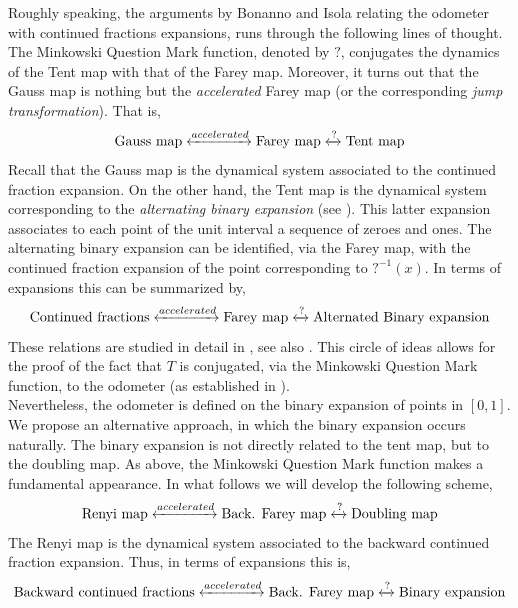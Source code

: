 \documentclass[letterpaper,10pt,reqno]{amsart}
\numberwithin{equation}{section}     %
\begin{document}
Roughly speaking, the arguments by Bonanno and Isola relating the odometer with continued fractions expansions, runs through the following lines of thought. The Minkowski Question Mark function, denoted by $
?$, conjugates the dynamics of the Tent map with that of the Farey map. Moreover, it turns out that the Gauss map is nothing but the \emph{accelerated} Farey map (or the corresponding \emph{jump transformation}). That is, 
\begin{equation*}
\text{Gauss map} \xleftrightarrow{accelerated} \text{Farey map} \xleftrightarrow{?} \text{Tent map}
\end{equation*}
{ Recall that the Gauss map is the dynamical system associated to the continued fraction expansion. On the other hand,} the Tent map is the dynamical system corresponding to the \emph{alternating binary expansion} (see \cite[Section 2.3.3]{dkr}). This latter expansion associates to each point of the unit interval a sequence of zeroes and ones. The alternating binary expansion can be identified, via the Farey map, with the continued fraction expansion of the point corresponding to $?^{-1}(x)$. In terms of expansions this can be summarized by,
\begin{equation*}
\text{Continued fractions} \xleftrightarrow{accelerated} \text{Farey map} \xleftrightarrow{?} \text{Alternated Binary expansion}
\end{equation*} 
These relations are studied in detail in \cite{kms}, see also \cite[Section 2.1]{i2}. 
This circle of ideas allows for the proof of the fact that $T$ is conjugated, via the Minkowski Question Mark function, to the odometer (as established in \cite{bi}). \\



Nevertheless, the odometer is  defined on the binary expansion of points in $[0,1]$. We propose an alternative approach, in which the binary expansion occurs naturally. The binary expansion is not directly related to the tent map, but to the doubling map. As above, the Minkowski Question Mark function makes a fundamental appearance. In what follows we will develop the following scheme, 
\begin{equation*}
\text{Renyi map} \xleftrightarrow{accelerated} \text{Back. Farey map} \xleftrightarrow{?} \text{Doubling map}
\end{equation*}
{ The Renyi map is the dynamical system associated to the backward continued fraction expansion. Thus, } in terms of expansions this is,
\begin{equation*}
\text{Backward continued fractions} \xleftrightarrow{accelerated} \text{Back. Farey map} \xleftrightarrow{?} \text{Binary expansion}
\end{equation*}
\end{document}
